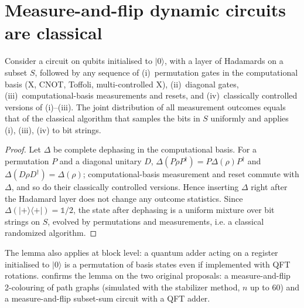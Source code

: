 \section{Measure-and-flip dynamic circuits are classical}\label{sec:classical}
\begin{lemma}[Classicality]\label{lem:classical}
Consider a circuit on qubits initialised to $|0\rangle$, with a layer of Hadamards on a subset $S$, followed by any sequence of (i)~permutation gates in the computational basis (X, CNOT, Toffoli, multi-controlled X), (ii)~diagonal gates, (iii)~computational-basis measurements and resets, and (iv)~classically controlled versions of (i)--(iii). The joint distribution of all measurement outcomes equals that of the classical algorithm that samples the bits in $S$ uniformly and applies (i), (iii), (iv) to bit strings.
\end{lemma}
\begin{proof}
Let $\Delta$ be complete dephasing in the computational basis. For a permutation $P$ and a diagonal unitary $D$, $\Delta(P\rho P^\dagger)=P\Delta(\rho)P^\dagger$ and $\Delta(D\rho D^\dagger)=\Delta(\rho)$; computational-basis measurement and reset commute with $\Delta$, and so do their classically controlled versions. Hence inserting $\Delta$ right after the Hadamard layer does not change any outcome statistics. Since $\Delta(|{+}\rangle\langle{+}|)=\mathbb{1}/2$, the state after dephasing is a uniform mixture over bit strings on $S$, evolved by permutations and measurements, i.e. a classical randomized algorithm.
\end{proof}
The lemma also applies at block level: a quantum adder acting on a register initialised to $|0\rangle$ is a permutation of basis states even if implemented with QFT rotations.  confirms the lemma on the two original proposals: a measure-and-flip 2-colouring of path graphs (simulated with the stabilizer method, $n$ up to 60) and a measure-and-flip subset-sum circuit with a QFT adder.



